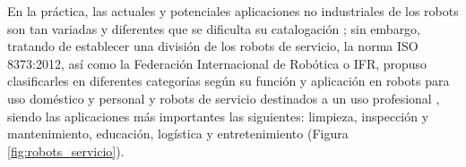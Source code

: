 En la práctica, las actuales y potenciales aplicaciones no industriales de los robots son tan variadas y diferentes que se dificulta su catalogación \cite{Barrientos02}; sin embargo, tratando de establecer una división de los robots de servicio, la norma ISO 8373:2012, así como la Federación Internacional de Robótica o IFR, propuso clasificarles en diferentes categorías según su función y aplicación en robots para uso doméstico y personal y robots de servicio destinados a un uso profesional \cite{Gonzalez21}, siendo las aplicaciones más importantes las siguientes: limpieza, inspección y mantenimiento, educación, logística y entretenimiento (Figura \ref{fig:robots_servicio}).




